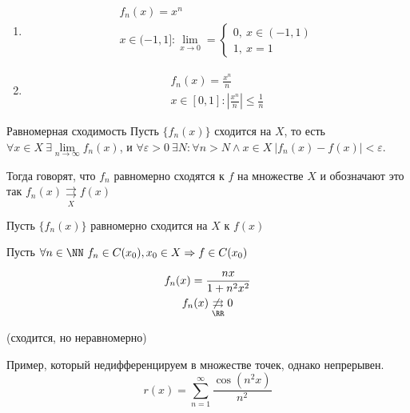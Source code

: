 \begin{example}{}{}
    \begin{enumerate}
        \item
            \begin{gather*}
                f_n(x) = x^n
                \\
                x \in (-1, 1]:
                \lim\limits_{x \to 0} = \begin{cases}
                    0, \ x \in (-1, 1)
                    \\
                    1, \ x = 1
                \end{cases}
            \end{gather*}
        \item
            \begin{gather*}
                f_n(x) = \frac{x^n}{n}
                \\
                x \in [0, 1]: \left| \frac{x^n}{n} \right| \leq \frac{1}{n}
            \end{gather*}
    \end{enumerate}
\end{example}

\newpage

\begin{defn}{Равномерная сходимость}{}
    Пусть \( \{ f_n(x) \} \) сходится на \( X \), 
    то есть \( \forall x \in X \ \exists \lim\limits_{n \to \infty} f_n(x) \),
    и \( \forall \varepsilon > 0 \ \exists N : \forall n > N \land x \in X \ |f_n(x) - f(x)| < \varepsilon \).

    Тогда говорят, что \( f_n \) равномерно сходятся к \( f \)
    на множестве \( X \) и обозначают это так \( f_n(x) \underset{X}{\rightrightarrows} f(x) \)
\end{defn}

\begin{thrm}{}{}
    Пусть \( \{ f_n(x) \} \) равномерно сходится на \( X \) к \( f(x) \)

    Пусть \( \forall n \in \NN \ f_n \in C(x_0), x_0 \in X \Rightarrow f \in C(x_0) \)
\end{thrm}

\begin{exercise}{}{}
    \begin{gather*}
        f_n(x) = \frac{nx}{1 + n^2 x^2}
        \\
        f_n(x) \underset{\RR}{\not\rightrightarrows} 0
    \end{gather*}

    (сходится, но неравномерно)
\end{exercise}

Пример, который недифференцируем в множестве точек, однако непрерывен.
\[
    r(x) = \sum\limits_{n = 1}^{\infty} \frac{\cos(n^2 x)}{n^2}
\]
